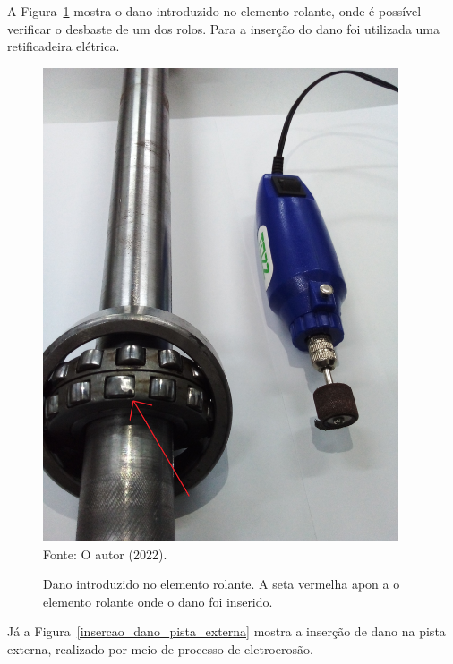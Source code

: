 \documentclass[
	12pt,				
	oneside,			
	a4paper,			
	english,			
	brazil,	
	sumario=abnt-6027-2012		
	]{abntex2ppgsi}
\begin{document}
A Figura~\ref{dano_introduzido_rolante} mostra o dano introduzido no elemento rolante, onde é possível verificar o desbaste de um dos rolos. Para a inserção do dano foi utilizada uma retificadeira elétrica.

\begin{figure}[H]
\centering
\caption {Dano introduzido no elemento rolante. A seta vermelha apon
a o elemento rolante onde o dano foi inserido.}
\includegraphics[width=\textwidth,height=140mm,keepaspectratio]{dano_introduzido_rolante} \\
Fonte: O autor (2022).
\label{dano_introduzido_rolante}
\end{figure}

Já a Figura~\ref{insercao_dano_pista_externa} mostra a inserção de dano na pista externa, realizado por meio de processo de eletroerosão.
\end{document}

